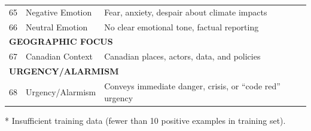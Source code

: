 {\begin{longtable}{p{0.5cm}p{5cm}p{16cm}}
65 & Negative Emotion & Fear, anxiety, despair about climate impacts \\
66 & Neutral Emotion & No clear emotional tone, factual reporting \\
\midrule
\multicolumn{3}{l}{\cellcolor{gray!10}\textbf{GEOGRAPHIC FOCUS}} \\
67 & Canadian Context & Canadian places, actors, data, and policies \\
\midrule
\multicolumn{3}{l}{\cellcolor{gray!10}\textbf{URGENCY/ALARMISM}} \\
68 & Urgency/Alarmism & Conveys immediate danger, crisis, or ``code red'' urgency \\
\bottomrule
\end{longtable}
\vspace{0.5em}
\noindent\footnotesize
* Insufficient training data (fewer than 10 positive examples in training set).
} %
\endlandscape